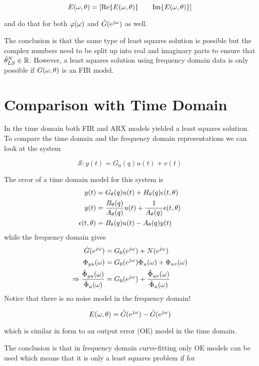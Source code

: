 \begin{equation*}
E(\omega,\theta) = \left[\text{Re}\{E(\omega,\theta)\} \qquad \text{Im}\{E(\omega,\theta)\}\right]
\end{equation*}

and do that for both $\varphi(\omega)$ and $\hat{G}(e^{j\omega})$ as well.

The conclusion is that the same type of least squares solution is possible but the complex numbers need to be split up into real and imaginary parts to ensure that $\hat{\theta}_{LS}^N\in\mathbb{R}$.
However, a least squares solution using frequency domain data is only possible if $G(\omega,\theta)$ is an FIR model.

\section{Comparison with Time Domain}
In the time domain both FIR and ARX models yielded a least squares solution.
To compare the time domain and the frequency domain representations we can look at the system

\begin{equation*}
\mathcal{S}: y(t) = G_0(q)u(t) + v(t)
\end{equation*}

The error of a time domain model for this system is
\begin{align*}
y(t) &= G_\theta(q) u(t)+H_\theta(q)\epsilon(t,\theta) \\
y(t) &= \frac{B_\theta(q)}{A_\theta(q)}u(t) + \frac{1}{A_\theta(q)}\epsilon(t,\theta) \\
\epsilon(t,\theta) &= B_\theta(q)u(t) - A_\theta(q)y(t)
\end{align*}
while the frequency domain gives
\begin{align*}
\hat{G}(e^{j\omega}) &= G_0(e^{j\omega}) + N(e^{j\omega}) \\
\Phi_{yu}(\omega) &= G_0(e^{j\omega})\Phi_u(\omega) + \Phi_{uv}(\omega) \\
\Rightarrow \frac{\hat{\Phi}_{yu}(\omega)}{\hat{\Phi}_u(\omega)} &= G_0(e^{j\omega}) + \frac{\hat{\Phi}_{uv}(\omega)}{\hat{\Phi}_u(\omega)}
\end{align*}
Notice that there is no noise model in the frequency domain!

\begin{equation*}
E(\omega,\theta) = \hat{G}(e^{j\omega}) - \tilde{G}(e^{j\omega})
\end{equation*}

which is similar in form to an output error (OE) model in the time domain.

The conclusion is that in frequency domain curve-fitting only OE models can be used which means that it is only a least squares problem if for

